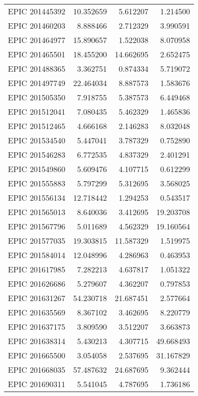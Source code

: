 \begin{tabular}{lrrr}
 EPIC 201445392 &  10.352659 &   5.612207 &   1.214500 \\
 EPIC 201460203 &   8.888466 &   2.712329 &   3.990591 \\
 EPIC 201464977 &  15.890657 &   1.522038 &   8.070958 \\
 EPIC 201465501 &  18.455200 &  14.662695 &   2.652475 \\
 EPIC 201488365 &   3.362751 &   0.874334 &   5.719072 \\
 EPIC 201497749 &  22.464034 &   8.887573 &   1.583676 \\
 EPIC 201505350 &   7.918755 &   5.387573 &   6.449468 \\
 EPIC 201512041 &   7.080435 &   5.462329 &   1.465836 \\
 EPIC 201512465 &   4.666168 &   2.146283 &   8.032048 \\
 EPIC 201534540 &   5.447041 &   3.787329 &   0.752890 \\
 EPIC 201546283 &   6.772535 &   4.837329 &   2.401291 \\
 EPIC 201549860 &   5.609476 &   4.107715 &   0.612299 \\
 EPIC 201555883 &   5.797299 &   5.312695 &   3.568025 \\
 EPIC 201556134 &  12.718442 &   1.294253 &   0.543517 \\
 EPIC 201565013 &   8.640036 &   3.412695 &  19.203708 \\
 EPIC 201567796 &   5.011689 &   4.562329 &  19.160564 \\
 EPIC 201577035 &  19.303815 &  11.587329 &   1.519975 \\
 EPIC 201584014 &  12.048996 &   4.286963 &   0.463953 \\
 EPIC 201617985 &   7.282213 &   4.637817 &   1.051322 \\
 EPIC 201626686 &   5.279607 &   4.362207 &   0.797853 \\
 EPIC 201631267 &  54.230718 &  21.687451 &   2.577664 \\
 EPIC 201635569 &   8.367102 &   3.462695 &   8.220779 \\
 EPIC 201637175 &   3.809590 &   3.512207 &   3.663873 \\
 EPIC 201638314 &   5.430213 &   4.307715 &  49.668493 \\
 EPIC 201665500 &   3.054058 &   2.537695 &  31.167829 \\
 EPIC 201668035 &  57.487632 &  24.687695 &   9.362444 \\
 EPIC 201690311 &   5.541045 &   4.787695 &   1.736186 \\

\end{tabular}
